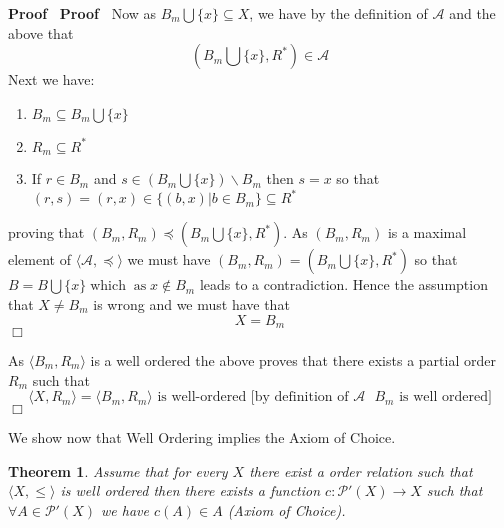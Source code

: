 \documentclass{book}
\newcommand{\nin}{\not\in}
\newcommand{\tmop}[1]{\ensuremath{\operatorname{#1}}}
\newenvironment{proof}{\noindent\textbf{Proof\ }}{\hspace*{\fill}$\Box$\medskip}
\newtheorem{theorem}{Theorem}
\begin{document}
\begin{proof}
\begin{proof}
    Now as $B_m \bigcup \{ x \} \subseteq X$, we have by the definition of
    $\mathcal{A}$ and the above that
    \[ \left( B_m \bigcup \{ x \}, R^{\ast} \right) \in \mathcal{A} \]
    Next we have:
    \begin{enumerate}
      \item $B_m \subseteq B_m \bigcup \{ x \}$
      
      \item $R_m \subseteq R^{\ast}$
      
      \item If $r \in B_m$ and $s \in \left( B_m \bigcup \{ x \} \right)
      \backslash B_m$ then $s = x$ so that $(r, s) = (r, x) \in \{ (b, x) |b
      \in B_m \} \subseteq R^{\ast}$
    \end{enumerate}
    proving that $(B_m, R_m) \preccurlyeq \left( B_m \bigcup \{ x \}, R^{\ast}
    \right)$. As $(B_m, R_m)$ is a maximal element of $\langle \mathcal{A},
    \preccurlyeq \rangle$ we must have $(B_m, R_m) = \left( B_m \bigcup \{ x
    \}, R^{\ast} \right)$ so that $B = B \bigcup \{ x \} \tmop{which}
    \tmop{as} x \nin B_m$ leads to a contradiction. Hence the assumption that
    $X \neq B_m$ is wrong and we must have that
    \[ X = B_m \]
  \end{proof}
  
  As $\langle B_m, R_m \rangle$ is a well ordered the above proves that there
  exists a partial order $R_m$ such that
  \[ \langle X, R_m \rangle = \langle B_m, R_m \rangle  \text{ is
     well-ordered [by definition of $\mathcal{A}$ } B_m \text{ is well
     ordered]} \]
\end{proof}

We show now that Well Ordering implies the Axiom of Choice.

\begin{theorem}
  \label{choice well-order implies Axiom of Choice}Assume that for every $X$
  there exist a order relation such that $\langle X, \leqslant \rangle$ is
  well ordered then there exists a function $c : \mathcal{P}' (X) \rightarrow
  X$ such that $\forall A \in \mathcal{P}' (X)$ we have $c (A) \in A$ (Axiom
  of Choice).
\end{theorem}
\end{document}
